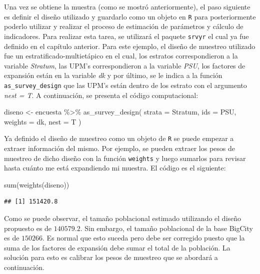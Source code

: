 \documentclass[
  12pt,
]{book}
\newenvironment{Shaded}{\begin{snugshade}}{\end{snugshade}}
\newcommand{\AttributeTok}[1]{\textcolor[rgb]{0.77,0.63,0.00}{#1}}
\newcommand{\FunctionTok}[1]{\textcolor[rgb]{0.00,0.00,0.00}{#1}}
\newcommand{\NormalTok}[1]{#1}
\newcommand{\OtherTok}[1]{\textcolor[rgb]{0.56,0.35,0.01}{#1}}
\newcommand{\SpecialCharTok}[1]{\textcolor[rgb]{0.00,0.00,0.00}{#1}}
\begin{document}
Una vez se obtiene la muestra (como se mostró anteriormente), el paso siguiente es definir el diseño utilizado y guardarlo como un objeto en \texttt{R} para posteriormente poderlo utilizar y realizar el proceso de estimación de parámetros y cálculo de indicadores. Para realizar esta tarea, se utilizará el paquete \texttt{srvyr} el cual ya fue definido en el capítulo anterior. Para este ejemplo, el diseño de muestreo utilizado fue un estratificado-multietápico en el cual, los estratos correspondieron a la variable \emph{Stratum}, las UPM's correspondieron a la variable \emph{PSU}, los factores de expansión están en la variable \emph{dk} y por último, se le indica a la función \texttt{as\_survey\_design} que las UPM's están dentro de los estrato con el argumento \emph{nest = T}. A continuación, se presenta el código computacional:

\begin{Shaded}
\begin{Highlighting}[]
\NormalTok{diseno }\OtherTok{\textless{}{-}}\NormalTok{ encuesta }\SpecialCharTok{\%\textgreater{}\%}
  \FunctionTok{as\_survey\_design}\NormalTok{(}
    \AttributeTok{strata =}\NormalTok{ Stratum,}
    \AttributeTok{ids =}\NormalTok{ PSU,}
    \AttributeTok{weights =}\NormalTok{ dk,}
    \AttributeTok{nest =}\NormalTok{ T}
\NormalTok{  )}
\end{Highlighting}
\end{Shaded}

Ya definido el diseño de muestreo como un objeto de \texttt{R} se puede empezar a extraer información del mismo. Por ejemplo, se pueden extraer los pesos de muestreo de dicho diseño con la función \texttt{weights} y luego sumarlos para revisar hasta cuánto me está expandiendo mi muestra. El código es el siguiente:

\begin{Shaded}
\begin{Highlighting}[]
\FunctionTok{sum}\NormalTok{(}\FunctionTok{weights}\NormalTok{(diseno))}
\end{Highlighting}
\end{Shaded}

\begin{verbatim}
## [1] 151420.8
\end{verbatim}

Como se puede observar, el tamaño poblacional estimado utilizando el diseño propuesto es de \(140579.2\). Sin embargo, el tamaño poblacional de la base BigCity es de \(150266\). Es normal que esto suceda pero debe ser corregido puesto que la suma de los factores de expansión debe sumar el total de la población. La solución para esto es calibrar los pesos de muestreo que se abordará a continuación.
\end{document}
